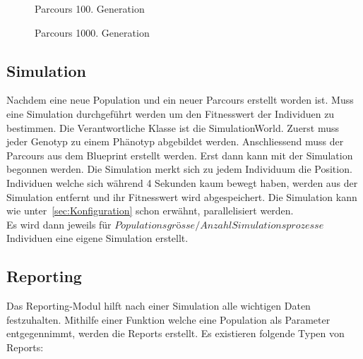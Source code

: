       \begin{figure}[H]
        \centering
        
        \caption{Parcours 100. Generation\label{fig:parcours2}}
      \end{figure}

      \begin{figure}[H]
        \centering
        
        \caption{Parcours 1000. Generation\label{fig:parcours3}}
      \end{figure}

      \subsection{Simulation\label{sec:simulation}}

        Nachdem eine neue Population und ein neuer Parcours erstellt worden ist.
        Muss eine Simulation durchgeführt werden um den Fitnesswert der Individuen zu bestimmen.
        Die Verantwortliche Klasse ist die SimulationWorld.
        Zuerst muss jeder Genotyp zu einem Phänotyp abgebildet werden.
        Anschliessend muss der Parcours aus dem Blueprint erstellt werden. %
        Erst dann kann mit der Simulation begonnen werden.
        Die Simulation merkt sich zu jedem Individuum die Position.
        Individuen welche sich während 4 Sekunden kaum bewegt haben,
        werden aus der Simulation entfernt und ihr Fitnesswert wird abgespeichert.
        Die Simulation kann wie unter~\ref{sec:Konfiguration} schon erwähnt, parallelisiert werden. \\
        Es wird dann jeweils für \( Populationsgrösse / Anzahl Simulationsprozesse \) Individuen eine eigene Simulation erstellt.

    \subsection{Reporting\label{subsec:Reporting}}

      Das Reporting-Modul hilft nach einer Simulation alle wichtigen Daten festzuhalten.
      Mithilfe einer Funktion welche eine Population als Parameter entgegennimmt,
      werden die Reports erstellt.
      Es existieren folgende Typen von Reports:

